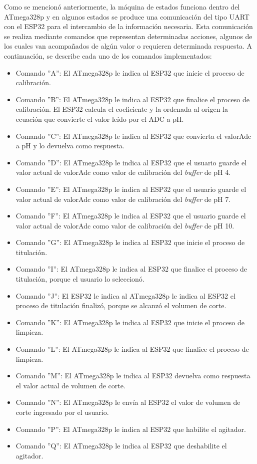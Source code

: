 Como se mencionó anteriormente, la máquina de estados funciona dentro del ATmega328p y en algunos estados se produce una comunicación del tipo UART con el ESP32 para el intercambio de la información necesaria. Esta comunicación se realiza mediante comandos que representan determinadas acciones, algunos de los cuales van acompañados de algún valor o requieren determinada respuesta. A continuación, se describe cada uno de los comandos implementados:

\begin{itemize}
	\item Comando ''A'': El ATmega328p le indica al ESP32 que inicie el proceso de calibración.
	\item Comando ''B'': El ATmega328p le indica al ESP32 que finalice el proceso de calibración. El ESP32 calcula el coeficiente y la ordenada al origen la ecuación que convierte el valor leído por el ADC a pH.
	\item Comando ''C'': El ATmega328p le indica al ESP32 que convierta el valorAdc a pH y lo devuelva como respuesta.
	\item Comando ''D'': El ATmega328p le indica al ESP32 que el usuario guarde el valor actual de valorAdc como valor de calibración del \textit{buffer} de pH 4.
	\item Comando ''E'': El ATmega328p le indica al ESP32 que el usuario guarde el valor actual de valorAdc como valor de calibración del \textit{buffer} de pH 7.
	\item Comando ''F'': El ATmega328p le indica al ESP32 que el usuario guarde el valor actual de valorAdc como valor de calibración del \textit{buffer} de pH 10.
	\item Comando ''G'': El ATmega328p le indica al ESP32 que inicie el proceso de titulación.
	\item Comando ''I'': El ATmega328p le indica al ESP32 que finalice el proceso de titulación, porque el usuario lo seleccionó.  
	\item Comando ''J'': El ESP32 le indica al ATmega328p le indica al ESP32 el proceso de titulación finalizó, porque se alcanzó el volumen de corte.
	\item Comando ''K'': El ATmega328p le indica al ESP32 que inicie el proceso de limpieza.
	\item Comando ''L'': El ATmega328p le indica al ESP32 que finalice el proceso de limpieza.
	\item Comando ''M'': El ATmega328p le indica al ESP32 devuelva como respuesta el valor actual de volumen de corte.
	\item Comando ''N'': El ATmega328p le envía al ESP32 el valor de volumen de corte ingresado por el usuario.
	\item Comando ''P'': El ATmega328p le indica al ESP32 que habilite el agitador.
	\item Comando ''Q'': El ATmega328p le indica al ESP32 que deshabilite el agitador.
\end{itemize}



